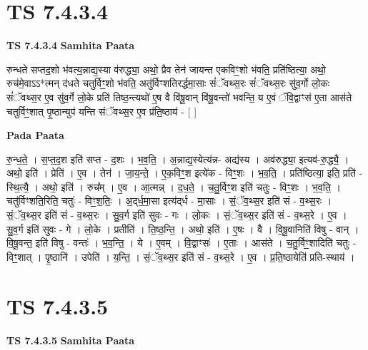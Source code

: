 \documentclass[17pt]{extarticle}
\begin{document}
\section*{ TS 7.4.3.4 }

\textbf{TS 7.4.3.4 } \newline
\textbf{Samhita Paata} \newline

रुन्धते सप्तद॒शो भ॑वत्य॒न्नाद्य॒स्या व॑रुद्ध्या॒ अथो॒ प्रैव तेन॑ जायन्त एकविꣳ॒॒शो भ॑वति॒ प्रति॑ष्ठित्या॒ अथो॒ रुच॑मे॒वाऽऽ*त्मन् द॑धते चतुर्विꣳ॒॒शो भ॑वति॒ अतु॑र्विꣳशतिरर्द्धमा॒साः सं॑ॅवथ्स॒रः सं॑ॅवथ्स॒रः सु॑व॒र्गो लो॒कः सं॑ॅवथ्स॒र ए॒व सु॑व॒र्गे लो॒के प्रति॑ तिष्ठ॒न्त्यथो॑ ए॒ष वै वि॑षू॒वान् वि॑षू॒वन्तो॑ भवन्ति॒ य ए॒वं ॅवि॒द्वाꣳस॑ ए॒ता आस॑ते चतुर्विꣳ॒॒शात् पृ॒ष्ठान्युप॑ यन्ति संॅवथ्स॒र ए॒व प्र॑ति॒ष्ठाय॑ - [  ] \newline

\textbf{Pada Paata} \newline

रु॒न्ध॒ते॒ । स॒प्त॒द॒श इति॑ सप्त - द॒शः । भ॒व॒ति॒ । अ॒न्नाद्य॒स्येत्य॑न्न- अद्य॑स्य । अव॑रुद्ध्या॒ इत्यव॑-रु॒द्ध्यै॒ । अथो॒ इति॑ । प्रेति॑ । ए॒व । तेन॑ । जा॒य॒न्ते॒ । ए॒क॒विꣳ॒॒श इत्ये॑क - विꣳ॒॒शः । भ॒व॒ति॒ । प्रति॑ष्ठित्या॒ इति॒ प्रति॑ - स्थि॒त्यै॒ । अथो॒ इति॑ । रुच᳚म् । ए॒व । आ॒त्मन्न् । द॒ध॒ते॒ । च॒तु॒र्विꣳ॒॒श इति॑ चतुः - विꣳ॒॒शः । भ॒व॒ति॒ । चतु॑र्विꣳशति॒रिति॒ चतुः॑ - विꣳ॒॒श॒तिः॒ । अ॒द्‌र्ध॒मा॒सा इत्य॑द्‌र्ध - मा॒साः । सं॒ॅव॒थ्स॒र इति॑ सं - व॒थ्स॒रः । सं॒ॅव॒थ्स॒र इति॑ सं - व॒थ्स॒रः । सु॒व॒र्ग इति॑ सुवः - गः । लो॒कः । सं॒ॅव॒थ्स॒र इति॑ सं - व॒थ्स॒रे । ए॒व । सु॒व॒र्ग इति॑ सुवः - गे । लो॒के । प्रतीति॑ । ति॒ष्ठ॒न्ति॒ । अथो॒ इति॑ । ए॒षः । वै । वि॒षू॒वानिति॑ विषु - वान् । वि॒षू॒वन्त॒ इति॑ विषु - वन्तः॑ । भ॒व॒न्ति॒ । ये । ए॒वम् । वि॒द्वाꣳसः॑ । ए॒ताः । आस॑ते । च॒तु॒र्विꣳ॒॒शादिति॑ चतुः - विꣳ॒॒शात् । पृ॒ष्ठानि॑ । उपेति॑ । य॒न्ति॒ । सं॒ॅव॒थ्स॒र इति॑ सं - व॒थ्स॒रे । ए॒व । प्र॒ति॒ष्ठायेति॑ प्रति-स्थाय॑ ।  \newline




\section*{ TS 7.4.3.5 }

\textbf{TS 7.4.3.5 } \newline
\textbf{Samhita Paata} \newline
\end{document}

